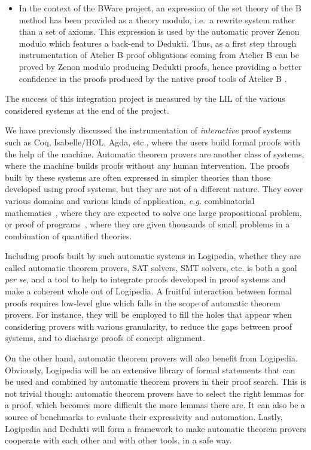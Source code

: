 \begin{itemize}
\item In the context of the BWare project, an expression of the set
  theory of the B method has been provided as a theory modulo, i.e.\ a
  rewrite system rather than a set of axioms. This expression is used
  by the automatic prover Zenon modulo which features a back-end to
  Dedukti. Thus, as a first step through instrumentation of Atelier B
  proof obligations coming from Atelier B can be proved by Zenon
  modulo producing Dedukti proofs, hence providing a better confidence
  in the proofs produced by the native proof tools of Atelier B
  \cite{Bware}.
\end{itemize}

The success of this integration project is measured by the LIL of the various
considered systems at the end of the project.


We have previously discussed the instrumentation of \emph{interactive}
proof systems such as Coq, Isabelle/HOL, Agda, etc.,
where the users build formal proofs with the help of the
machine. Automatic theorem provers are another class of systems, where
the machine builds proofs without any human intervention. The proofs
built by these systems are often expressed in simpler theories than
those developed using proof systems, but they are not of a different
nature.  They cover various domains and various kinds of application,
{\em e.g.}  combinatorial
mathematics~\cite{DBLP:journals/ai/KonevL15,DBLP:conf/sat/HeuleKM16},
where they are expected to solve one large propositional problem, or
proof of
programs~\cite{DBLP:conf/esop/FilliatreP13,DBLP:journals/pacmpl/ProtzenkoZRRWBD17},
where they are given thousands of small problems in a combination of
quantified theories.

Including proofs built by such automatic systems in Logipedia,
whether they are called automatic theorem provers, SAT solvers, SMT
solvers, etc. is both a goal {\em per se}, and a tool to help to
integrate proofs developed in proof systems and make a coherent whole out
of Logipedia. A fruitful interaction between formal proofs requires
low-level glue which falls in the scope of automatic theorem provers.
For instance, they will be employed to fill the holes that appear when
considering provers with various granularity, to reduce the gaps
between proof systems, and to discharge proofs of concept alignment.

On the other hand, automatic theorem provers will also benefit from
Logipedia. Obviously, Logipedia will be an extensive library of formal
statements that can be used and combined by automatic theorem provers
in their proof search. This is not trivial though: automatic theorem
provers have to select the right lemmas for a proof, which becomes
more difficult the more lemmas there are. It can also be a source of benchmarks to
evaluate their expressivity and automation.  Lastly, Logipedia and
Dedukti will form a framework to make automatic theorem provers
cooperate with each other and with other tools, in a safe way.

